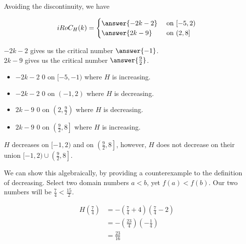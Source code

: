 \documentclass{ximera}
\begin{document}
\begin{exercise}
\begin{question}
Avoiding the discontinuity, we have

\[
iRoC_H(k) = 
\begin{cases}
  \answer{-2k - 2}   & \text{ on } [-5, 2)   \\
  \answer{2k - 9}     & \text{ on } (2, 8]  
\end{cases}
\]



$-2k - 2$ gives us the critical number $\answer{-1}$. \\


$2k - 9$ gives us the critical number $\answer{\frac{9}{2}}$. \\







\begin{itemize}
\item $-2k - 2$ \wordChoice{\choice{$<$} [correct]\choice{$>$}}  $0$ on  $[-5, -1)$ where $H$ is increasing.
\item $-2k - 2$ \wordChoice{\choice[correct]{$<$} \choice{$>$}}  $0$ on  $(-1, 2)$ where $H$ is decreasing.
\item $2k - 9$ \wordChoice{\choice[correct]{$<$} \choice{$>$}}  $0$ on  $\left( 2, \frac{9}{2} \right)$ where $H$ is decreasing.
\item $2k - 9$ \wordChoice{\choice{$<$} [correct]\choice{$>$}}  $0$ on  $\left( \frac{9}{2}, 8 \right]$ where $H$ is increasing.
\end{itemize}







\begin{warning}


$H$ decreases on $[-1, 2)$ and on $\left( \frac{9}{2}, 8 \right]$, however, $H$ does not decrease on their union $[-1, 2) \cup \left( \frac{9}{2}, 8 \right]$.



We can show this algebraically, by providing a counterexample to the definition of decreasing. Select two domain numbers $a < b$, yet $f(a) < f(b)$.  Our two numbers will be $\frac{7}{4} < \frac{15}{2}$.


\begin{align*}
H\left( \frac{7}{4} \right) & = -\left( \frac{7}{4} + 4 \right) \left( \frac{7}{4} - 2 \right) \\
& = -\left( \frac{23}{4} \right) \left( -\frac{1}{4} \right) \\
& = \frac{23}{16}  
\end{align*}



\end{warning}
\end{question}
\end{exercise}
\end{document}
